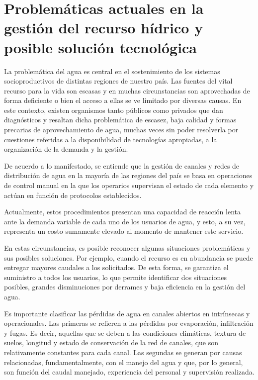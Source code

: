 \section{Problemáticas actuales en la gestión del recurso hídrico y posible solución tecnológica}
La problemática del agua es central en el sostenimiento de los sistemas socioproductivos de distintas regiones de nuestro país. Las fuentes del vital recurso para la vida son escasas y en muchas circunstancias son aprovechadas de forma deficiente o bien el acceso a ellas se ve limitado por diversas causas. En este contexto, existen organismos tanto  públicos como privados que dan diagnósticos y resaltan dicha problemática de escasez, baja calidad y formas precarias de aprovechamiento de agua, muchas veces sin poder resolverla por cuestiones referidas a la disponibilidad de tecnologías apropiadas, a la organización de la demanda y la gestión. 	 

De acuerdo a lo manifestado, se entiende que la gestión de canales y redes de distribución de agua en la mayoría de las regiones del país se basa en operaciones de control manual en la que los operarios supervisan el estado de cada elemento y actúan en función de protocolos establecidos.

Actualmente, estos procedimientos presentan una capacidad de reacción lenta ante la demanda variable de cada uno de los usuarios de agua, y esto, a su vez, representa un costo sumamente elevado al momento de mantener este servicio.

En estas circunstancias, es posible reconocer algunas situaciones problemáticas y sus posibles soluciones. Por ejemplo, cuando el recurso es en abundancia se puede entregar mayores caudales a los solicitados. De esta forma, se garantiza el suministro a todos los usuarios, lo que permite identificar dos situaciones posibles, grandes disminuciones por derrames y baja eficiencia en la gestión del agua.

Es importante clasificar las pérdidas de agua en canales abiertos en intrínsecas y operacionales. Las primeras se refieren a las pérdidas por evaporación, infiltración y fugas. Es decir, aquellas que se deben a las
condiciones climáticas, textura de suelos, longitud y estado de conservación de la red de canales, que son relativamente constantes para cada canal. Las segundas se generan por causas relacionadas, fundamentalmente, con el manejo del agua y que, por lo general, son función del caudal manejado, experiencia del personal y supervisión realizada.

